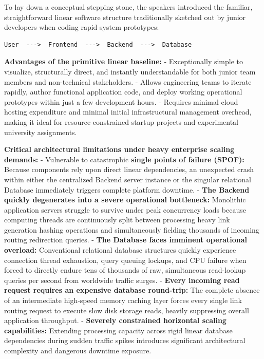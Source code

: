 To lay down a conceptual stepping stone, the speakers introduced the
familiar, straightforward linear software structure traditionally
sketched out by junior developers when coding rapid system prototypes:

\begin{verbatim}
User  --->  Frontend  --->  Backend  --->  Database
\end{verbatim}

\textbf{Advantages of the primitive linear baseline:} - Exceptionally
simple to visualize, structurally direct, and instantly understandable
for both junior team members and non-technical stakeholders. - Allows
engineering teams to iterate rapidly, author functional application
code, and deploy working operational prototypes within just a few
development hours. - Requires minimal cloud hosting expenditure and
minimal initial infrastructural management overhead, making it ideal for
resource-constrained startup projects and experimental university
assignments.

\textbf{Critical architectural limitations under heavy enterprise
scaling demands:} - Vulnerable to catastrophic \textbf{single points of
failure (SPOF):} Because components rely upon direct linear
dependencies, an unexpected crash within either the centralized Backend
server instance or the singular relational Database immediately triggers
complete platform downtime. - \textbf{The Backend quickly degenerates
into a severe operational bottleneck:} Monolithic application servers
struggle to survive under peak concurrency loads because computing
threads are continuously split between processing heavy link generation
hashing operations and simultaneously fielding thousands of incoming
routing redirection queries. - \textbf{The Database faces imminent
operational overload:} Conventional relational database structures
quickly experience connection thread exhaustion, query queuing lockups,
and CPU failure when forced to directly endure tens of thousands of raw,
simultaneous read-lookup queries per second from worldwide traffic
surges. - \textbf{Every incoming read request requires an expensive
database round-trip:} The complete absence of an intermediate high-speed
memory caching layer forces every single link routing request to execute
slow disk storage reads, heavily suppressing overall application
throughput. - \textbf{Severely constrained horizontal scaling
capabilities:} Extending processing capacity across rigid linear
database dependencies during sudden traffic spikes introduces
significant architectural complexity and dangerous downtime exposure.

